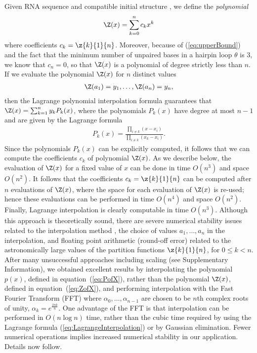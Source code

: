 Given RNA sequence \seq and compatible initial structure \strSt,
we define the {\em polynomial}
\begin{eqnarray}
\label{eq:polynomialYann}
\Z(x) = \sum_{k=0}^n c_k x^k
\end{eqnarray}
where coefficients $c_k=\z{k}{1}{n}$. Moreover, because of
(\ref{eq:upperBound}) and the fact that the minimum number of
unpaired bases in a hairpin loop $\theta$ is $3$, we know that $c_n=0$,
so that $\Z(x)$ is a polynomial of degree strictly less than $n$.
If we evaluate the polynomial $\Z(x)$ for $n$ distinct values
\begin{eqnarray}
\label{eq:ZofX}
\Z(a_1) = y_1,\ldots, \Z(a_{n}) = y_{n},
\end{eqnarray}
then the Lagrange polynomial interpolation formula guarantees that
$\Z(x) = \sum_{k=1}^n y_k P_k(x)$, where the polynomials $P_k(x)$ have degree
at most $n-1$ and are given by the Lagrange formula
\begin{eqnarray}
\label{eq:LagrangeInterpolation}
P_k(x) = \frac{\prod_{i\ne k} (x-x_i)}{\prod_{i \ne k} (x_k-x_i)}.
\end{eqnarray}
Since the polynomials $P_k(x)$ can be explicitly computed, it follows that
we can compute the coefficients $c_k$ of polynomial $\Z(x)$. As we describe
below, the evaluation of $\Z(x)$ for a fixed value of $x$ can be done in
time $O(n^3)$ and space $O(n^2)$.  It follows that the coefficients
$c_k=\z{k}{1}{n}$ can be computed after
$n$ evaluations of $\Z(x)$, where the space for each evaluation of $\Z(x)$
is re-used; hence these evaluations can be performed in time $O(n^4)$ and space
$O(n^2)$. Finally,
Lagrange interpolation is clearly computable in time $O(n^3)$.
Although this approach is theoretically sound, there are severe
numerical stability issues related to the interpolation method
\citep{HighamBarycentricInterpolation},
the choice of values $a_1,\ldots,a_{n}$ in the interpolation,
and floating point arithmetic (round-off error) related to the
astronomically large values of the partition functions
$\z{k}{1}{n}$, for $0 \leq k < n$. After many unsuccessful
approaches including scaling (see Supplementary Information),
we obtained excellent results by
interpolating the polynomial $p(x)$, defined in equation~(\ref{eq:PofX}),
rather than the polynomial $\Z(x)$, defined in equation~(\ref{eq:ZofX}),
and performing interpolation with the Fast Fourier Transform (FFT) \citep{cormen}
where $\alpha_0,\ldots,\alpha_{n-1}$ are
chosen to be $n$th complex roots of unity,
$\alpha_k = e^{\frac{2 \pi k}{n}}$.
One
advantage of the FFT is that interpolation can be performed in $O(n \log n)$
time, rather than the cubic time required by using the Lagrange formula
(\ref{eq:LagrangeInterpolation}) or by Gaussian elimination. Fewer
numerical operations implies increased numerical stability in our application.
Details now follow.

